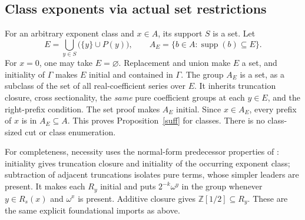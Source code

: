 \documentclass[11pt]{article}
\newcommand{\D}{\mathbb{Z}[1/2]}
\newcommand{\supp}{\operatorname{supp}}
\begin{document}
\subsection{Class exponents via actual set restrictions}
For an arbitrary exponent class and $x\in A$, its support $S$ is a set.
Let
\[
 E=\bigcup_{y\in S}\bigl(\{y\}\cup P(y)\bigr),
 \qquad A_E=\{b\in A:\supp(b)\subseteq E\}.
\]
For $x=0$, one may take $E=\varnothing$.
Replacement and union make $E$ a set, and initiality of $\Gamma$ makes
$E$ initial and contained in $\Gamma$. The group $A_E$ is a set, as
a subclass of the set of all real-coefficient series over $E$.
It inherits truncation closure, cross sectionality, the \emph{same}
pure coefficient groups at each $y\in E$, and the right-prefix condition.
The set proof makes $A_E$ initial. Since $x\in A_E$, every prefix of $x$
is in $A_E\subseteq A$. This proves Proposition~\ref{suff} for classes.
There is no class-sized cut or class enumeration.

For completeness, necessity uses the normal-form predecessor properties
of \cite[Proposition 3.2(i)--(ii), Lemma 3.1(i),(iv)]{ek}:
initiality gives truncation closure and initiality of the occurring
exponent class; subtraction of adjacent truncations isolates pure terms,
whose simpler leaders are present. It makes each $R_y$ initial and puts
$2^{-k}\omega^y$ in the group whenever $y\in R_s(x)$ and $\omega^x$ is
present. Additive closure gives $\D\subseteq R_y$.
These are the same explicit foundational imports as above.
\end{document}
